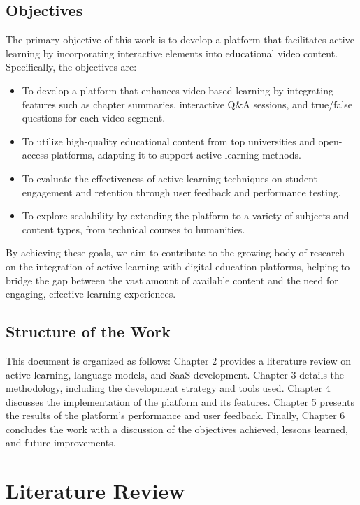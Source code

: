 \documentclass[tcc,capa]{texufpel}
\begin{document}
\section{Objectives}
The primary objective of this work is to develop a platform that facilitates active learning by incorporating interactive elements into educational video content. Specifically, the objectives are:

\begin{itemize}
    \item To develop a platform that enhances video-based learning by integrating features such as chapter summaries, interactive Q\&A sessions, and true/false questions for each video segment.
    \item To utilize high-quality educational content from top universities and open-access platforms, adapting it to support active learning methods.
    \item To evaluate the effectiveness of active learning techniques on student engagement and retention through user feedback and performance testing.
    \item To explore scalability by extending the platform to a variety of subjects and content types, from technical courses to humanities.
\end{itemize}

By achieving these goals, we aim to contribute to the growing body of research on the integration of active learning with digital education platforms, helping to bridge the gap between the vast amount of available content and the need for engaging, effective learning experiences.

\section{Structure of the Work}
This document is organized as follows: Chapter 2 provides a literature review on active learning, language models, and SaaS development. Chapter 3 details the methodology, including the development strategy and tools used. Chapter 4 discusses the implementation of the platform and its features. Chapter 5 presents the results of the platform's performance and user feedback. Finally, Chapter 6 concludes the work with a discussion of the objectives achieved, lessons learned, and future improvements.


\chapter{Literature Review}
\end{document}
